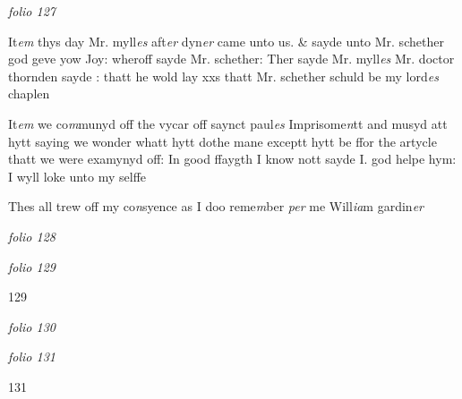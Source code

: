 \documentclass[12pt, a4paper]{book}
\begin{document}
\dotfill
					

\textit{folio 127}


 	
		\ifthenelse{\isodd{\thepage}}
		{\reversemarginpar}
		{\normalmarginpar}
		It\textit{em} thys day Mr. myll\textit{es} aft\textit{er} dyn\textit{er} came unto us. \& sayde unto Mr. schether
 		god geve yow Joy: wheroff sayde Mr. schether: Ther sayde Mr. myll\textit{es}
 		Mr. doctor thornden sayde : thatt he wold lay xxs thatt Mr. schether
 schuld be my lord\textit{es} chaplen

		\ifthenelse{\isodd{\thepage}}
		{\reversemarginpar}
		{\normalmarginpar}
		It\textit{em} we co\textit{m}munyd off the vycar off saynct paul\textit{es} Imprisome\textit{n}tt and musyd
 att hytt saying we wonder whatt hytt dothe mane exceptt hytt be
 ffor the artycle thatt we were examynyd off: In good ffaygth I know
 nott sayde I. god helpe hym: I wyll loke unto my selffe
 
		\ifthenelse{\isodd{\thepage}}
		{\reversemarginpar}
		{\normalmarginpar}
		Thes all trew off my co\textit{n}syence as I doo reme\textit{m}ber
 \textit{per} me Will\textit{ia}m gardin\textit{er}
               
\dotfill
					

\textit{folio 128}


         \vspace{4cm}
         
\dotfill
					

\textit{folio 129}


\begin{flushright}{\color{Mahogany}129}\end{flushright}

\dotfill
					

\textit{folio 130}


         \vspace{4cm}
         
\dotfill
					

\textit{folio 131}


\begin{flushright}{\color{Mahogany}131}\end{flushright}
\end{document}
